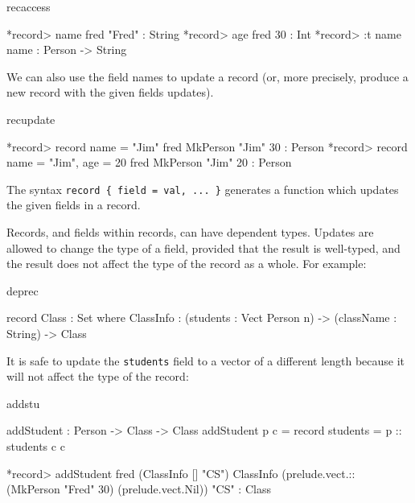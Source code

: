 \begin{SaveVerbatim}{recaccess}

*record> name fred
"Fred" : String
*record> age fred
30 : Int
*record> :t name
name : Person -> String

\end{SaveVerbatim}

\noindent
We can also use the field names to update a record (or, more precisely, produce a
new record with the given fields updates).

\begin{SaveVerbatim}{recupdate}

*record> record { name = "Jim" } fred
MkPerson "Jim" 30 : Person
*record> record { name = "Jim", age = 20 } fred
MkPerson "Jim" 20 : Person

\end{SaveVerbatim}

\noindent
The syntax \texttt{record \{ field = val, ... \}} generates a function which updates
the given fields in a record. 

Records, and fields within records, can have dependent types.
Updates are allowed to change the type of a field,
provided that the result is well-typed, and the result does not affect the type of
the record as a whole. For example:

\begin{SaveVerbatim}{deprec}

record Class : Set where
    ClassInfo : (students : Vect Person n) ->
                (className : String) ->
                Class

\end{SaveVerbatim}

\noindent
It is safe to update the \texttt{students} field to a vector of a different length
because it will not affect the type of the record:

\begin{SaveVerbatim}{addstu}

addStudent : Person -> Class -> Class
addStudent p c = record { students = p :: students c } c

*record> addStudent fred (ClassInfo [] "CS")
ClassInfo (prelude.vect.:: (MkPerson "Fred" 30) (prelude.vect.Nil)) "CS" 
  : Class

\end{SaveVerbatim}

